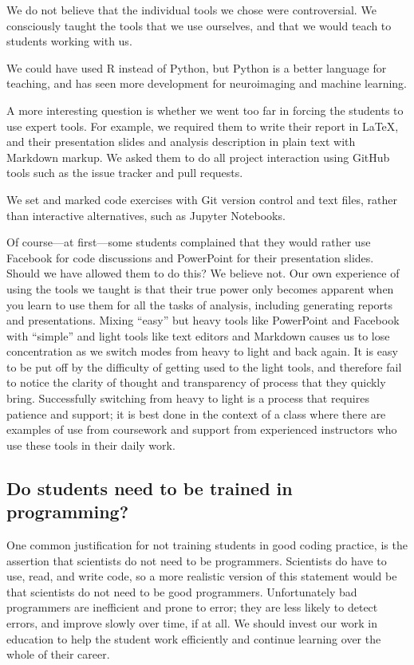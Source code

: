 We do not believe that the individual tools we chose were controversial. We
consciously taught the tools that we use ourselves, and that we would teach to
students working with us.

We could have used R instead of Python, but Python is a better language for
teaching, and has seen more development for neuroimaging and machine learning.

A more interesting question is whether we went too far in forcing the students
to use expert tools.  For example, we required them to write their
report in \LaTeX, and their presentation slides and analysis description in
plain text with Markdown markup.  We asked them to do all project interaction
using GitHub tools such as the issue tracker and pull requests.

We set and marked code exercises with Git version control and text files,
rather than interactive alternatives, such as Jupyter Notebooks.

Of course---at first---some students complained that they would rather use
Facebook for code discussions and PowerPoint for their presentation slides.
Should we have allowed them to do this?  We believe not.  Our own experience
of using the tools we taught is that their true power only becomes apparent
when you learn to use them for all the tasks of analysis, including generating
reports and presentations.  Mixing ``easy'' but heavy tools like PowerPoint
and Facebook with ``simple'' and light tools like text editors and Markdown
causes us to lose concentration as we switch modes from heavy to light and
back again. It is easy to be put off by the difficulty of getting used to the
light tools, and therefore fail to notice the clarity of thought and
transparency of process that they quickly bring.  Successfully switching from
heavy to light is a process that requires patience and support; it is best
done in the context of a class where there are examples of use from coursework
and support from experienced instructors who use these tools in their daily
work.

\subsection{Do students need to be trained in programming?}

One common justification for not training students in good coding practice, is
the assertion that scientists do not need to be programmers.  Scientists do
have to use, read, and write code, so a more realistic version of this
statement would be that scientists do not need to be good programmers.
Unfortunately bad programmers are inefficient and prone to error; they are
less likely to detect errors, and improve slowly over time, if at all.  We
should invest our work in education to help the student work efficiently and
continue learning over the whole of their career.

